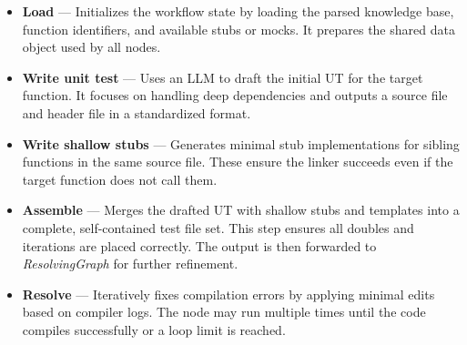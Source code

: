 \documentclass[conference]{IEEEtran}
\begin{document}
{\begin{itemize}
{\small
\begin{figure}[h]
  \centering
  \begin{lstlisting}[style=cstyle,
    breaklines=true,
    breakatwhitespace=false,
    columns=fullflexible,
    keepspaces=true,
    breakindent=0pt,
    postbreak=\mbox{\textcolor{gray}{$\hookrightarrow$}\space},
    basicstyle=\ttfamily\scriptsize]
    [
      {
        "id": 1,
        "completed": false,
        "function_name": "",
        "source_file_name": "",
        "source_file_location": "",
        "ut_folder": {},
        "source_code": null,
        "header_code": null,
        "language": ""
      },
      {
        "id": 2,
        "completed": false,
        "function_name": "",
        "source_file_name": "",
        "source_file_location": "",
        "ut_folder": {},
        "source_code": null,
        "header_code": null,
        "language": ""
      },
    ] 
  \end{lstlisting}
  \caption{\texttt{groundtruth.json} structure}
  \label{fig:ground_truth}
\end{figure}
}


  \item \textbf{Load} — Initializes the workflow state by loading the parsed knowledge base, function identifiers, and available stubs or mocks. It prepares the shared data object used by all nodes.

  \item \textbf{Write unit test} — Uses an LLM to draft the initial UT for the target function. It focuses on handling deep dependencies and outputs a source file and header file in a standardized format.

  \item \textbf{Write shallow stubs} — Generates minimal stub implementations for sibling functions in the same source file. These ensure the linker succeeds even if the target function does not call them.

  \item \textbf{Assemble} — Merges the drafted UT with shallow stubs and templates into a complete, self-contained test file set. This step ensures all doubles and iterations are placed correctly. The output is then forwarded to \textit{ResolvingGraph} for further refinement.

  \item \textbf{Resolve} — Iteratively fixes compilation errors by applying minimal edits based on compiler logs. The node may run multiple times until the code compiles successfully or a loop limit is reached.


\end{itemize}}
\end{document}
